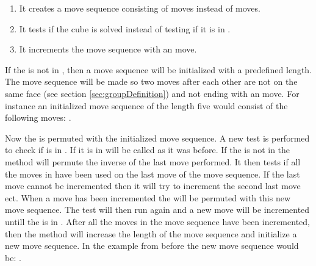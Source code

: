 \begin{enumerate}
	\item It creates a move sequence consisting of  moves instead of  moves.
	\item It tests if the cube is solved instead of testing if it is in .
	\item It increments the move sequence with an  move.
\end{enumerate} 

If the \rubik{} is not in , then a move sequence will be initialized with a predefined length.
The move sequence will be made so two moves after each other are not on the same face (see section \ref{sec:groupDefinition}) and not ending with an  move.
For instance an initialized move sequence of the length five would consist of the following moves: .

Now the \rubik{} is permuted with the initialized move sequence.
A new test is performed to check if \rubik{} is in .
If it is in   will be called as it was before.
If the \rubik{} is not in  the method will permute the inverse of the last move performed.
It then tests if all the moves in  have been used on the last move of the move sequence.
If the last move cannot be incremented then it will try to increment the second last move ect.
When a move has been incremented the \rubik{} will be permuted with this new move sequence.
The test will then run again and a new move will be incremented untill the \rubik{} is in .
After all the moves in the move sequence have been incremented, then the method will increase the length of the move sequence and initialize a new move sequence.
In the example from before the new move sequence would be: .

